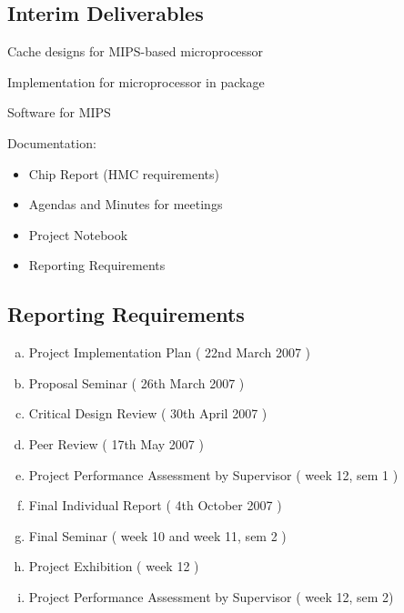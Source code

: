 \documentclass[a4paper,12pt]{article}
\begin{document}
\subsection{Interim Deliverables}
\begin{enumerate}[{[ID}1{]}]
\item Cache designs for MIPS-based microprocessor
\item Implementation for microprocessor in package
\item Software for MIPS
\item Documentation: 
  \begin{itemize}
  \item Chip Report (HMC requirements)
  \item Agendas and Minutes for meetings
  \item Project Notebook
  \item Reporting Requirements
  \end{itemize}
\end{enumerate}

\subsection{Reporting Requirements}
\begin{enumerate}[a)]
\item Project Implementation Plan  ( 22nd March 2007 )
\item Proposal Seminar ( 26th March 2007 )
\item Critical Design Review ( 30th April 2007 )
\item Peer Review ( 17th May 2007 )
\item Project Performance Assessment by Supervisor ( week 12,  sem 1 )
\item Final Individual Report ( 4th October 2007 )
\item Final Seminar ( week 10 and week 11, sem 2 )
\item Project Exhibition ( week 12 )
\item Project Performance Assessment by Supervisor ( week
  12, sem 2)
\end{enumerate}

\end{document}
